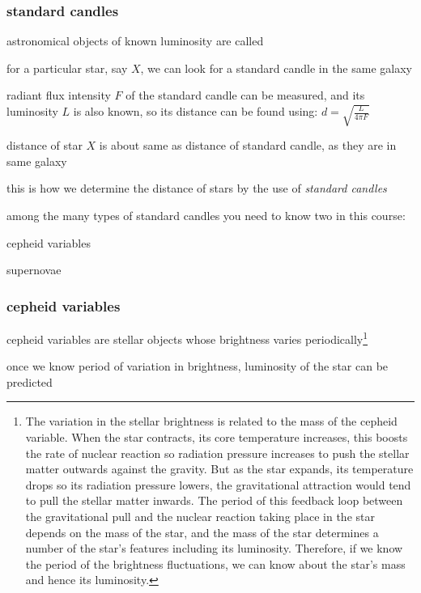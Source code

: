 \subsubsection{standard candles}

\begin{ilight}
	astronomical objects of known luminosity are called 
\end{ilight}

for a particular star, say $X$, we can look for a standard candle in the same galaxy

radiant flux intensity $F$ of the standard candle can be measured, and its luminosity $L$ is also known, so its distance can be found using: $d = \sqrt{\frac{L}{4\pi F}}$

distance of star $X$ is about same as distance of standard candle, as they are in same galaxy

this is how we determine the distance of stars by the use of \emph{standard candles}


\newpage

among the many types of standard candles you need to know two in this course:

\titem cepheid variables

\titem supernovae

\subsubsection*{cepheid variables}

cepheid variables are stellar objects whose brightness varies periodically\footnote{The variation in the stellar brightness is related to the mass of the cepheid variable. When the star contracts, its core temperature increases, this boosts the rate of nuclear reaction so radiation pressure increases to push the stellar matter outwards against the gravity. But as the star expands, its temperature drops so its radiation pressure lowers, the gravitational attraction would tend to pull the stellar matter inwards. The period of this feedback loop between the gravitational pull and the nuclear reaction taking place in the star depends on the mass of the star, and the mass of the star determines a number of the star's features including its luminosity. Therefore, if we know the period of the brightness fluctuations, we can know about the star's mass and hence its luminosity.}

once we know period of variation in brightness, luminosity of the star can be predicted

